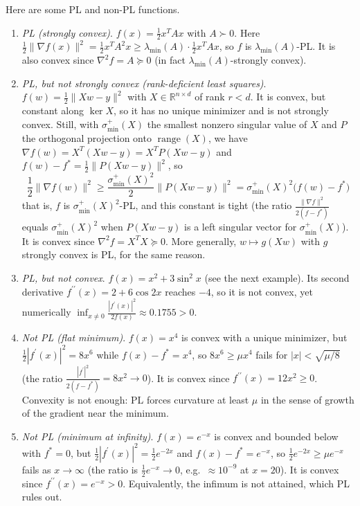 	\begin{example}
		Here are some PL and non-PL functions. 
		\begin{enumerate}
		  \item \textit{PL (strongly convex)}. $f(x) = \frac{1}{2} x^T A x$ with $A \succ 0$. Here $\frac{1}{2}\|\nabla f(x)\|^2 = \frac{1}{2} x^T A^2 x \geq \lambda_{\min}(A) \cdot \frac{1}{2} x^T A x$, so $f$ is $\lambda_{\min}(A)$-PL. It is also convex since $\nabla^2 f = A \succeq 0$ (in fact $\lambda_{\min}(A)$-strongly convex). 
		  \item \textit{PL, but not strongly convex (rank-deficient least squares)}. $f(w) = \frac{1}{2}\|Xw - y\|^2$ with $X \in \mathbb{R}^{n \times d}$ of rank $r < d$. It is convex, but constant along $\ker X$, so it has no unique minimizer and is not strongly convex. Still, with $\sigma_{\min}^+(X)$ the smallest nonzero singular value of $X$ and $P$ the orthogonal projection onto $\operatorname{range}(X)$, we have $\nabla f(w) = X^T (Xw - y) = X^T P (Xw - y)$ and $f(w) - f^\ast = \frac{1}{2}\|P(Xw - y)\|^2$, so
		  \begin{equation}
			  \frac{1}{2}\|\nabla f(w)\|^2 \geq \frac{\sigma_{\min}^+(X)^2}{2} \|P(Xw - y)\|^2 = \sigma_{\min}^+(X)^2 \big( f(w) - f^\ast \big)
		  \end{equation}
			that is, $f$ is $\sigma_{\min}^+(X)^2$-PL, and this constant is tight (the ratio $\frac{\|\nabla f\|^2}{2(f - f^\ast)}$ equals $\sigma_{\min}^+(X)^2$ when $P(Xw - y)$ is a left singular vector for $\sigma_{\min}^+(X)$). It is convex since $\nabla^2 f = X^TX \succeq 0$. More generally, $w \mapsto g(Xw)$ with $g$ strongly convex is PL, for the same reason. 
		  \item \textit{PL, but not convex}. $f(x) = x^2 + 3\sin^2 x$ (see the next example). Its second derivative $f^{\prime\prime}(x) = 2 + 6\cos 2x$ reaches $-4$, so it is not convex, yet numerically $\inf_{x \neq 0} \frac{|f^\prime(x)|^2}{2f(x)} \approx 0.1755 > 0$. 
			\item \textit{Not PL (flat minimum)}. $f(x) = x^4$ is convex with a unique minimizer, but $\frac{1}{2} |f^\prime(x)|^2 = 8x^6$ while $f(x) - f^\ast = x^4$, so $8x^6 \geq \mu x^4$ fails for $|x| < \sqrt{\mu/8}$ (the ratio $\frac{|f^\prime|^2}{2(f - f^\ast)} = 8x^2 \to 0$). It is convex since $f^{\prime\prime}(x) = 12x^2 \geq 0$. Convexity is not enough: PL forces curvature at least $\mu$ in the sense of growth of the gradient near the minimum. 
			\item \textit{Not PL (minimum at infinity)}. $f(x) = e^{-x}$ is convex and bounded below with $f^\ast = 0$, but $\frac{1}{2}|f^\prime(x)|^2 = \frac{1}{2}e^{-2x}$ and $f(x) - f^\ast = e^{-x}$, so $\frac{1}{2} e^{-2x} \geq \mu e^{-x}$ fails as $x \to \infty$ (the ratio is $\frac{1}{2}e^{-x} \to 0$, e.g.\ $\approx 10^{-9}$ at $x = 20$). It is convex since $f^{\prime\prime}(x) = e^{-x} > 0$. Equivalently, the infimum is not attained, which PL rules out. 

\end{enumerate}
\end{example}
